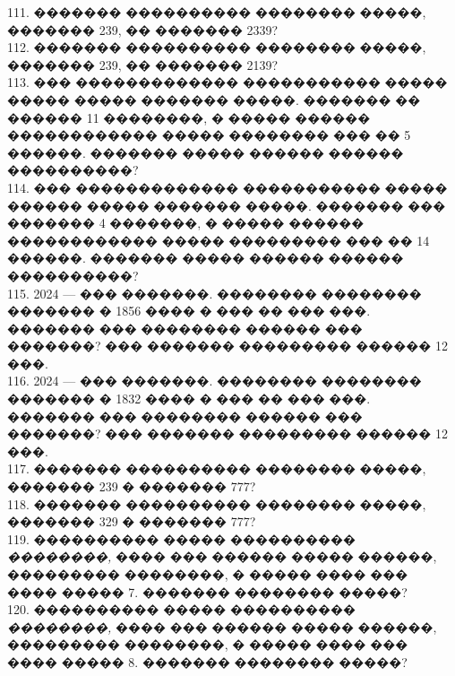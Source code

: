 \documentclass[12pt]{article}
\begin{document}
111. ������� ���������� �������� �����, ������� 239, �� ������� 2339?\\
112. ������� ���������� �������� �����, ������� 239, �� ������� 2139?\\
113. ��� ������������� ����������� ����� ����� ����� ������� �����. ������� �� ������ 11 ��������, � ����� ������ ������������ ����� �������� ��� �� 5 ������. ������� ����� ������ ������ ����������?\\
114. ��� ������������� ����������� ����� ������ ����� ������� �����. ������� ��� ������� 4 �������, � ����� ������ ������������ ����� ��������� ��� �� 14 ������. ������� ����� ������ ������ ����������?\\
115. 2024 --- ��� �������. �������� �������� ������� � 1856 ���� � ��� �� ��� ���. ������� ��� �������� ������ ��� �������? ��� ������� ��������� ������ 12 ���.\\
116. 2024 --- ��� �������. �������� �������� ������� � 1832 ���� � ��� �� ��� ���. ������� ��� �������� ������ ��� �������? ��� ������� ��������� ������ 12 ���.\\
117. ������� ���������� �������� �����, ������� 239 � ������� 777?\\
118. ������� ���������� �������� �����, ������� 329 � ������� 777?\\
119. ���������� ����� ���������� {\it ��������,} ���� ��� ������ ����� ������, ��������� ��������, � ����� ���� ��� ���� ����� 7. ������� �������� �����?\\
120. ���������� ����� ���������� {\it ��������,} ���� ��� ������ ����� ������, ��������� ��������, � ����� ���� ��� ���� ����� 8. ������� �������� �����?
\newpage
\end{document}
